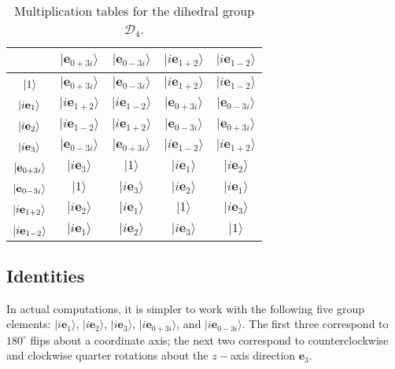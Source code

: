 \documentclass[11pt,twocolumn]{article}
\newcommand\T{\rule{0pt}{2.6ex}}
\begin{document}
\begin{table}
\begin{center}
\begin{tabular}{|c||c|c|c|c|}
\hline
\ & $|\mathbf e_{0+3i}\rangle$\T & $|\mathbf e_{0-3i}\rangle$ & $|i\mathbf e_{1+2}\rangle$ & $|i\mathbf e_{1-2}\rangle$\\
\hline\hline
$\T|1\rangle$ & $|\mathbf e_{0+3i}\rangle$ & $|\mathbf e_{0-3i}\rangle$ & $|i\mathbf e_{1+2}\rangle$ & $|i\mathbf e_{1-2}\rangle$\\
\hline
$\T|i\mathbf e_1\rangle$ & $|i\mathbf e_{1+2}\rangle$ & $|i\mathbf e_{1-2}\rangle$ & $|\mathbf e_{0+3i}\rangle$ & $|\mathbf e_{0-3i}\rangle$\\
\hline
$\T|i\mathbf e_2\rangle$ & $|i\mathbf e_{1-2}\rangle$ & $|i\mathbf e_{1+2}\rangle$ & $|\mathbf e_{0-3i}\rangle$ & $|\mathbf e_{0+3i}\rangle$\\
\hline
$\T|i\mathbf e_3\rangle$ & $|\mathbf e_{0-3i}\rangle$ & $|\mathbf e_{0+3i}\rangle$ & $|i\mathbf e_{1-2}\rangle$ & $|i\mathbf e_{1+2}\rangle$\\
\hline
$\T|\mathbf e_{0+3i}\rangle$ & $|i\mathbf e_3\rangle$ & $|1\rangle$ & $|i\mathbf e_1\rangle$ & $|i\mathbf e_2\rangle$\\
\hline
$\T|\mathbf e_{0-3i}\rangle$ & $|1\rangle$ & $|i\mathbf e_3\rangle$ & $|i\mathbf e_2\rangle$ & $|i\mathbf e_1\rangle$\\
\hline
$\T|i\mathbf e_{1+2}\rangle$ & $|i\mathbf e_2\rangle$ & $|i\mathbf e_1\rangle$ & $|1\rangle$ & $|i\mathbf e_3\rangle$\\
\hline
$\T|i\mathbf e_{1-2}\rangle$ & $|i\mathbf e_1\rangle$ & $|i\mathbf e_2\rangle$ & $|i\mathbf e_3\rangle$ & $|1\rangle$\\
\hline
\end{tabular}

\end{center}
\caption{\footnotesize Multiplication tables for the dihedral group $\mathcal D_4$.}
\end{table} 


\subsection{Identities}

In actual computations, it is simpler to work with the following five group elements: $|i\mathbf e_1\rangle$, $|i\mathbf e_2\rangle$, $|i\mathbf e_3\rangle$, $|i\mathbf e_{0+3i}\rangle$, and $|i\mathbf e_{0-3i}\rangle$.  The first three correspond to $180^\circ$ flips about a coordinate axis; the next two correspond to counterclockwise and clockwise quarter rotations about the $z-$axis direction $\mathbf e_3$.
\end{document}
